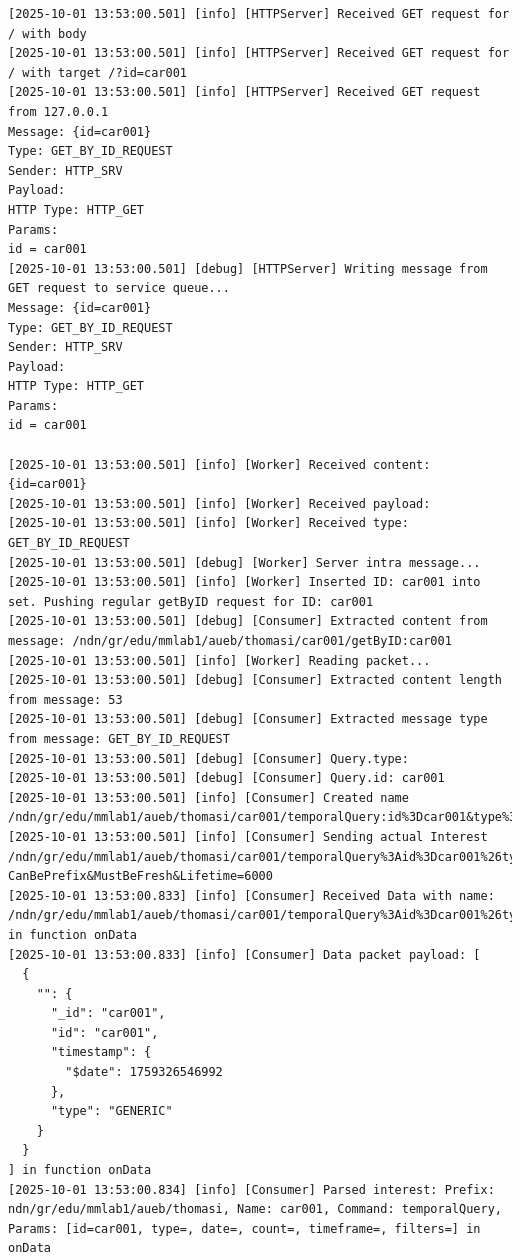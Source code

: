 \documentclass{article}
\begin{document}
\begin{lstlisting}[language=log, caption={GET by ID of \textit{@id=car001} through the \emph{UMemphis}}, label={lst:umemphis-get-by-id-car001}]
[2025-10-01 13:53:00.501] [info] [HTTPServer] Received GET request for / with body 
[2025-10-01 13:53:00.501] [info] [HTTPServer] Received GET request for / with target /?id=car001
[2025-10-01 13:53:00.501] [info] [HTTPServer] Received GET request from 127.0.0.1
Message: {id=car001}
Type: GET_BY_ID_REQUEST
Sender: HTTP_SRV
Payload: 
HTTP Type: HTTP_GET
Params:
id = car001
[2025-10-01 13:53:00.501] [debug] [HTTPServer] Writing message from GET request to service queue...
Message: {id=car001}
Type: GET_BY_ID_REQUEST
Sender: HTTP_SRV
Payload: 
HTTP Type: HTTP_GET
Params:
id = car001

[2025-10-01 13:53:00.501] [info] [Worker] Received content: {id=car001}
[2025-10-01 13:53:00.501] [info] [Worker] Received payload: 
[2025-10-01 13:53:00.501] [info] [Worker] Received type: GET_BY_ID_REQUEST
[2025-10-01 13:53:00.501] [debug] [Worker] Server intra message...
[2025-10-01 13:53:00.501] [info] [Worker] Inserted ID: car001 into set. Pushing regular getByID request for ID: car001
[2025-10-01 13:53:00.501] [debug] [Consumer] Extracted content from message: /ndn/gr/edu/mmlab1/aueb/thomasi/car001/getByID:car001
[2025-10-01 13:53:00.501] [info] [Worker] Reading packet...
[2025-10-01 13:53:00.501] [debug] [Consumer] Extracted content length from message: 53
[2025-10-01 13:53:00.501] [debug] [Consumer] Extracted message type from message: GET_BY_ID_REQUEST
[2025-10-01 13:53:00.501] [debug] [Consumer] Query.type: 
[2025-10-01 13:53:00.501] [debug] [Consumer] Query.id: car001
[2025-10-01 13:53:00.501] [info] [Consumer] Created name /ndn/gr/edu/mmlab1/aueb/thomasi/car001/temporalQuery:id%3Dcar001&type%3D&date%3D&count%3D&timeframe%3D&filters%3D
[2025-10-01 13:53:00.501] [info] [Consumer] Sending actual Interest /ndn/gr/edu/mmlab1/aueb/thomasi/car001/temporalQuery%3Aid%3Dcar001%26type%3D%26date%3D%26count%3D%26timeframe%3D%26filters%3D?CanBePrefix&MustBeFresh&Lifetime=6000
[2025-10-01 13:53:00.833] [info] [Consumer] Received Data with name: /ndn/gr/edu/mmlab1/aueb/thomasi/car001/temporalQuery%3Aid%3Dcar001%26type%3D%26date%3D%26count%3D%26timeframe%3D%26filters%3D in function onData
[2025-10-01 13:53:00.833] [info] [Consumer] Data packet payload: [
  {
    "": {
      "_id": "car001",
      "id": "car001",
      "timestamp": {
        "$date": 1759326546992
      },
      "type": "GENERIC"
    }
  }
] in function onData
[2025-10-01 13:53:00.834] [info] [Consumer] Parsed interest: Prefix: ndn/gr/edu/mmlab1/aueb/thomasi, Name: car001, Command: temporalQuery, Params: [id=car001, type=, date=, count=, timeframe=, filters=] in onData

\end{lstlisting}
\end{document}
